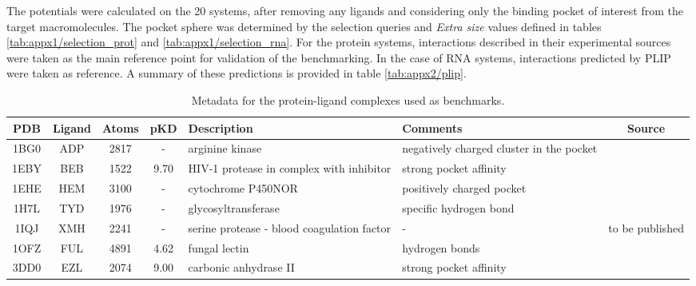   The potentials were calculated on the 20 systems, after removing any ligands and considering only the binding pocket of interest from the target macromolecules. The pocket sphere was determined by the selection queries and \textit{Extra size} values defined in tables \ref{tab:appx1/selection_prot} and \ref{tab:appx1/selection_rna}. For the protein systems, interactions described in their experimental sources were taken as the main reference point for validation of the benchmarking. In the case of RNA systems, interactions predicted by PLIP \cite{plip_2021} were taken as reference. A summary of these predictions is provided in table \ref{tab:appx2/plip}.

  \begin{table}[H]
    \caption{\label{tab:appx1/benchmark_prot} Metadata for the protein-ligand complexes used as benchmarks.}
    \centering
    \begin{tabular}{ccccp{1.5in}p{1.5in}c}
      \hline
      PDB  & Ligand  & Atoms & pKD   & Description                                & Comments                                      & Source                                   \\ \hline
      1BG0 & ADP     & 2817  & -     & arginine kinase                            & negatively charged cluster in the pocket      & \cite{benchmark_negative_2000}           \\ \hline
      1EBY & BEB     & 1522  & 9.70  & HIV-1 protease in complex with inhibitor   & strong pocket affinity                        & \cite{benchmark_strong_2021}             \\ \hline
      1EHE & HEM     & 3100  & -     & cytochrome P450NOR                         & positively charged pocket                     & \cite{benchmark_positive_2001}           \\ \hline
      1H7L & TYD     & 1976  & -     & glycosyltransferase                        & specific hydrogen bond                        & \cite{benchmark_1h7l_2001}               \\ \hline
      1IQJ & XMH     & 2241  & -     & serine protease - blood coagulation factor & -                                             & to be published                          \\ \hline
      1OFZ & FUL     & 4891  & 4.62  & fungal lectin                              & hydrogen bonds                                & \cite{hbonds_2023}                       \\ \hline
      3DD0 & EZL     & 2074  & 9.00  & carbonic anhydrase II                      & strong pocket affinity                        & \cite{benchmark_strong_2021}             \\ \hline

\end{tabular}
\end{table}
